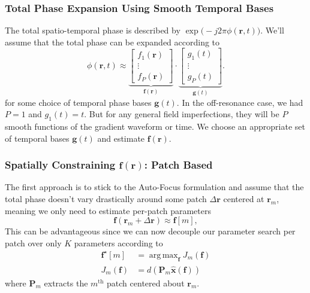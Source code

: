 \documentclass{article}
\DeclareMathOperator*{\argmax}{arg\,max}
\newcommand{\x}{\mathbf{x}}
\renewcommand{\r}{\mathbf{r}}
\newcommand{\f}{\mathbf{f}}
\newcommand{\g}{\mathbf{g}}
\renewcommand{\P}{\mathbf{P}}
\begin{document}
\subsubsection{Total Phase Expansion Using Smooth Temporal Bases}
The total spatio-temporal phase is described by $\exp\big( -j2\pi \phi(\r,  t)\big)$. We'll assume that the total phase can be expanded according to 
\begin{equation}
    \phi(\r,t) \approx \underbrace{\begin{bmatrix} f_1(\r) \\ \vdots \\ f_P(\r) \end{bmatrix}}_{\f(\r)} \cdot \underbrace{\begin{bmatrix} g_1(t) \\ \vdots \\ g_P(t) \end{bmatrix}}_{\g(t)}.
\end{equation}
for some choice of temporal phase bases $\g(t)$. In the off-resonance case, we had $P=1$ and $g_1(t) = t$. But for any general field imperfections, they will be $P$ smooth functions of the gradient waveform or time. We choose an appropriate set of temporal bases $\g(t)$ and estimate $\f(\r)$. 

\subsubsection{Spatially Constraining $\f(\r)$: Patch Based}
The first approach is to stick to the Auto-Focus formulation and assume that the total phase doesn't vary drastically around some patch $\Delta \r$ centered at $\r_m$, meaning we only need to estimate per-patch parameters
\begin{equation}
    \f(\r_m + \Delta \r) \approx \f[m],
\end{equation}
This can be advantageous since we can now decouple our parameter search per patch over only $K$ parameters according to 
\begin{align}
    \f^\star[m] &= \argmax_{\f} J_m(\f) \\
    J_m(\f) &= d(\P_m \hat{\x}(\f))
\end{align}
where $\P_m$ extracts the $m^\text{th}$ patch centered about $\r_m$. 
\end{document}
